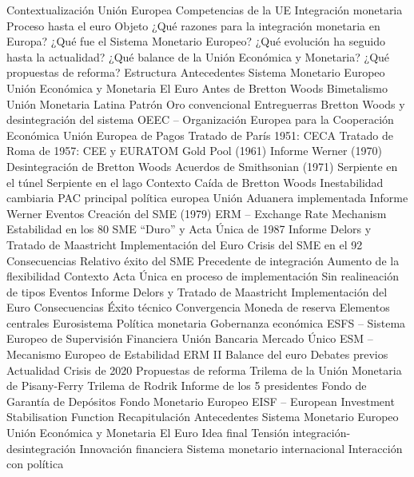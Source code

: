 \documentclass{nuevotema}
\begin{document}
\begin{esquema}[enumerate]
	\1[] 
		\2 Contextualización
			\3 Unión Europea
			\3 Competencias de la UE
			\3 Integración monetaria
			\3 Proceso hasta el euro
		\2 Objeto
			\3 ¿Qué razones para la integración monetaria en Europa?
			\3 ¿Qué fue el Sistema Monetario Europeo?
			\3 ¿Qué evolución ha seguido hasta la actualidad?
			\3 ¿Qué balance de la Unión Económica y Monetaria?
			\3 ¿Qué propuestas de reforma?
		\2 Estructura
			\3 Antecedentes
			\3 Sistema Monetario Europeo
			\3 Unión Económica y Monetaria
			\3 El Euro
	\1 
		\2 Antes de Bretton Woods
			\3 Bimetalismo
			\3 Unión Monetaria Latina
			\3 Patrón Oro convencional
			\3 Entreguerras
		\2 Bretton Woods y desintegración del sistema
			\3 OEEC -- Organización Europea para la Cooperación Económica
			\3 Unión Europea de Pagos
			\3 Tratado de París 1951: CECA
			\3 Tratado de Roma de 1957: CEE y EURATOM
			\3 Gold Pool (1961)
			\3 Informe Werner (1970)
			\3 Desintegración de Bretton Woods
			\3 Acuerdos de Smithsonian (1971)
			\3 Serpiente en el túnel
			\3 Serpiente en el lago
	\1 
		\2 Contexto
			\3 Caída de Bretton Woods
			\3 Inestabilidad cambiaria
			\3 PAC principal política europea
			\3 Unión Aduanera implementada
			\3 Informe Werner
		\2 Eventos
			\3 Creación del SME (1979)
			\3 ERM -- Exchange Rate Mechanism
			\3 Estabilidad en los 80
			\3 SME ``Duro'' y Acta Única de 1987
			\3 Informe Delors y Tratado de Maastricht
			\3 Implementación del Euro
			\3 Crisis del SME en el 92
		\2 Consecuencias
			\3 Relativo éxito del SME
			\3 Precedente de integración
			\3 Aumento de la flexibilidad
	\1 
		\2 Contexto
			\3 Acta Única en proceso de implementación
			\3 Sin realineación de tipos
		\2 Eventos
			\3 Informe Delors y Tratado de Maastricht
			\3 Implementación del Euro
		\2 Consecuencias
			\3 Éxito técnico
			\3 Convergencia
			\3 Moneda de reserva
	\1 
		\2 Elementos centrales
			\3 Eurosistema
			\3 Política monetaria
			\3 Gobernanza económica
			\3 ESFS -- Sistema Europeo de Supervisión Financiera
			\3 Unión Bancaria
			\3 Mercado Único
			\3 ESM -- Mecanismo Europeo de Estabilidad
			\3 ERM II
		\2 Balance del euro
			\3 Debates previos
			\3 Actualidad
			\3 Crisis de 2020
		\2 Propuestas de reforma
			\3 Trilema de la Unión Monetaria de Pisany-Ferry
			\3 Trilema de Rodrik
			\3 Informe de los 5 presidentes
			\3 Fondo de Garantía de Depósitos
			\3 Fondo Monetario Europeo
			\3 EISF -- European Investment Stabilisation Function
	\1[] 
		\2 Recapitulación
			\3 Antecedentes
			\3 Sistema Monetario Europeo
			\3 Unión Económica y Monetaria
			\3 El Euro
		\2 Idea final
			\3 Tensión integración-desintegración
			\3 Innovación financiera
			\3 Sistema monetario internacional
			\3 Interacción con política

\end{esquema}
\end{document}
